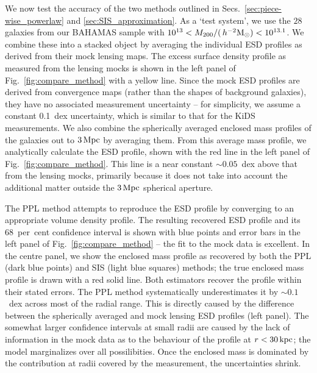\documentclass[usenatbib]{mnras}
\newcommand{\hmsun}{\,h^{-2} {\rm M_\odot}}
\begin{document}
We now test the accuracy of the two methods outlined in Secs.~\ref{sec:piece-wise_powerlaw} and \ref{sec:SIS_approximation}. As a `test system', we use the $28$ galaxies from our BAHAMAS sample with $10^{13}<M_{200}/(\hmsun)<10^{13.1}$. We combine these into a stacked object by averaging the individual ESD profiles as derived from their mock lensing maps. The excess surface density profile as measured from the lensing mocks is shown in the left panel of Fig.~\ref{fig:compare_method} with a yellow line. Since the mock ESD profiles are derived from convergence maps (rather than the shapes of background galaxies), they have no associated measurement uncertainty -- for simplicity, we assume a constant 0.1~dex uncertainty, which is similar to that for the KiDS measurements. We also combine the spherically averaged enclosed mass profiles of the galaxies out to $3\,{\rm Mpc}$ by averaging them. From this average mass profile, we analytically calculate the ESD profile, shown with the red line in the left panel of Fig.~\ref{fig:compare_method}. This line is a near constant $\sim 0.05$~dex above that from the lensing mocks, primarily because it does not take into account the additional matter outside the $3\,{\rm Mpc}$ spherical aperture.

The PPL method attempts to reproduce the ESD profile by converging to an appropriate volume density profile. The resulting recovered ESD profile and its 68~per~cent confidence interval is shown with blue points and error bars in the left panel of Fig.~\ref{fig:compare_method} -- the fit to the mock data is excellent. In the centre panel, we show the enclosed mass profile as recovered by both the PPL (dark blue points) and SIS (light blue squares) methods; the true enclosed mass profile is drawn with a red solid line. Both estimators recover the profile within their stated errors. The PPL method systematically underestimates it by $\sim 0.1$~dex across most of the radial range. This is directly caused by the difference between the spherically averaged and mock lensing ESD profiles (left panel). The somewhat larger confidence intervals at small radii are caused by the lack of information in the mock data as to the behaviour of the profile at $r < 30\,{\rm kpc}$; the model marginalizes over all possilibities. Once the enclosed mass is dominated by the contribution at radii covered by the measurement, the uncertainties shrink.
\end{document}

